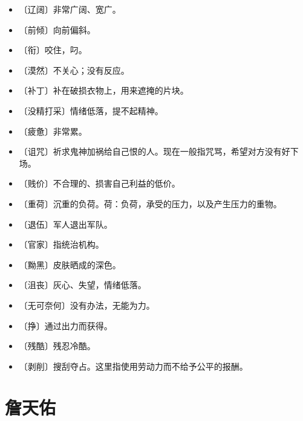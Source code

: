 \documentclass[12pt,UTF-8,openany]{ctexbook}
\begin{document}
\begin{itemize}
    \setlength\itemsep{-0.2em}
    \item 〔辽阔〕非常广阔、宽广。
    \item 〔前倾〕向前偏斜。
    \item 〔衔〕咬住，叼。
    \item 〔漠然〕不关心；没有反应。
    \item 〔补丁〕补在破损衣物上，用来遮掩的片块。
    \item 〔没精打采〕情绪低落，提不起精神。
    \item 〔疲惫〕非常累。
    \item 〔诅咒〕祈求鬼神加祸给自己恨的人。现在一般指咒骂，希望对方没有好下场。
    \item 〔贱价〕不合理的、损害自己利益的低价。
    \item 〔重荷〕沉重的负荷。荷：负荷，承受的压力，以及产生压力的重物。
    \item 〔退伍〕军人退出军队。
    \item 〔官家〕指统治机构。
    \item 〔黝黑〕皮肤晒成的深色。
    \item 〔沮丧〕灰心、失望，情绪低落。
    \item 〔无可奈何〕没有办法，无能为力。
    \item 〔挣〕通过出力而获得。
    \item 〔残酷〕残忍冷酷。
    \item 〔剥削〕搜刮夺占。这里指使用劳动力而不给予公平的报酬。
\end{itemize}

\chapter{詹天佑}
\end{document}
